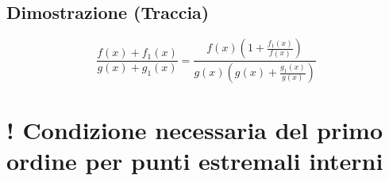 \documentclass{article}
\begin{document}
\begin{flushleft}
\subsection{Dimostrazione (Traccia)}
\[\frac{f(x)+f_1(x)}{g(x)+g_1(x)} = \frac{f(x)(1 + \frac{f_1(x)}{f(x)})}{g(x)(g(x) + \frac{g_1(x)}{g(x)})}\]

\section{! Condizione necessaria del primo ordine per punti estremali interni}
\end{flushleft}
\end{document}
